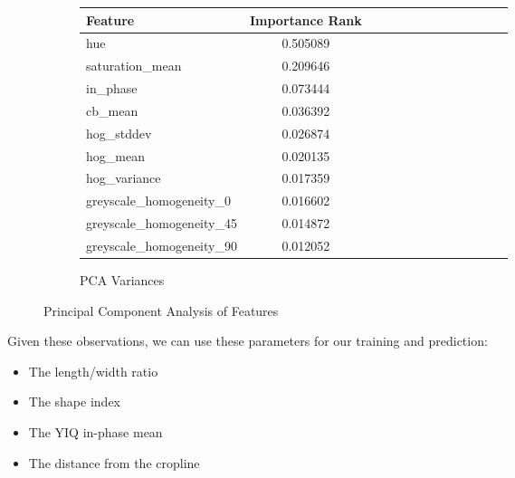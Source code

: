 \documentclass[letterpaper]{article}
\begin{document}
{\begin{figure}[h]
\begin{subfigure}[h]{.32\textwidth}
{		\begin{longtable}[c]{
		    |l |*{12}{c |} }%
		    \hline
		    {\textbf{Feature}} & {\textbf{Importance Rank}}\\
		    \hline
			hue                      &     0.505089 \\
			saturation\_mean          &     0.209646 \\
			in\_phase                 &     0.073444 \\
			cb\_mean                  &     0.036392 \\
			hog\_stddev               &     0.026874 \\
			hog\_mean                 &     0.020135 \\
			hog\_variance             &     0.017359 \\
			greyscale\_homogeneity\_0  &     0.016602 \\
			greyscale\_homogeneity\_45 &     0.014872 \\
			greyscale\_homogeneity\_90 &     0.012052 \\	    
		    
		    \hline
		  \end{longtable}
		 }
	  \caption{PCA Variances}
	\end{subfigure}
\caption{Principal Component Analysis of Features}
\label{fig:pca}
\end{figure}




 
  Given these observations, we can use these parameters for our training and prediction:
 \begin{itemize}
	\item{The length/width ratio}
	\item{The shape index}
	\item{The YIQ in-phase mean}
	\item{The distance from the cropline}
\end{itemize}

}
\end{document}
